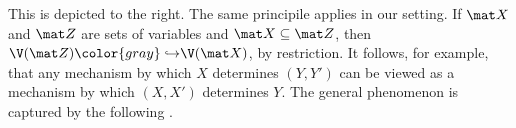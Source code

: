 \begin{subappendices}
This is depicted to the right.
%
The same principile applies in our setting.
If $\mat X$ and $\mat Z$ are sets of variables and $\mat X \subseteq \mat Z$, then 
$\V(\mat Z) {\color{gray}\hookrightarrow} \V(\mat X)$, by restriction. 
It follows, for example, that
    any mechanism by which $X$ determines $(Y,Y')$ can be viewed
        as a mechanism by which $(X,X')$ determines $Y$. 
The general phenomenon is captured by the following
    \unskip.


\end{subappendices}
